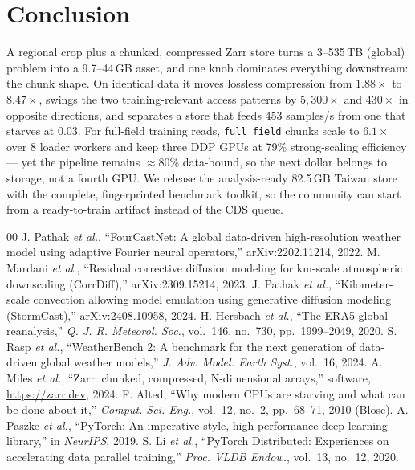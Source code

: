 \documentclass[conference]{IEEEtran}
\begin{document}
\section{Conclusion}
A regional crop plus a chunked, compressed Zarr store turns a 3--535\,TB
(global) problem into a 9.7--44\,GB asset, and one knob dominates everything
downstream: the chunk shape. On identical data it moves lossless compression
from $1.88\times$ to $8.47\times$, swings the two training-relevant access
patterns by $5{,}300\times$ and $430\times$ in opposite directions, and
separates a store that feeds 453 samples/s from one that starves at 0.03.
For full-field training reads, \texttt{full\_field} chunks scale to $6.1\times$
over 8 loader workers and keep three DDP GPUs at 79\% strong-scaling
efficiency --- yet the pipeline remains $\approx$80\% data-bound, so the next
dollar belongs to storage, not a fourth GPU. We release the analysis-ready
82.5\,GB Taiwan store with the complete, fingerprinted benchmark toolkit, so
the community can start from a ready-to-train artifact instead of the CDS
queue.

\begin{thebibliography}{00}
 J. Pathak \emph{et al.}, ``FourCastNet: A global data-driven
high-resolution weather model using adaptive Fourier neural operators,''
arXiv:2202.11214, 2022.
 M. Mardani \emph{et al.}, ``Residual corrective diffusion
modeling for km-scale atmospheric downscaling (CorrDiff),'' arXiv:2309.15214,
2023.
 J. Pathak \emph{et al.}, ``Kilometer-scale convection
allowing model emulation using generative diffusion modeling (StormCast),''
arXiv:2408.10958, 2024.
 H. Hersbach \emph{et al.}, ``The ERA5 global reanalysis,''
\emph{Q. J. R. Meteorol. Soc.}, vol.~146, no.~730, pp.~1999--2049, 2020.
 S. Rasp \emph{et al.}, ``WeatherBench 2: A benchmark for the
next generation of data-driven global weather models,'' \emph{J. Adv. Model.
Earth Syst.}, vol.~16, 2024.
 A. Miles \emph{et al.}, ``Zarr: chunked, compressed,
N-dimensional arrays,'' software, \url{https://zarr.dev}, 2024.
 F. Alted, ``Why modern CPUs are starving and what can be done
about it,'' \emph{Comput. Sci. Eng.}, vol.~12, no.~2, pp.~68--71, 2010
(Blosc).
 A. Paszke \emph{et al.}, ``PyTorch: An imperative style,
high-performance deep learning library,'' in \emph{NeurIPS}, 2019.
 S. Li \emph{et al.}, ``PyTorch Distributed: Experiences on
accelerating data parallel training,'' \emph{Proc. VLDB Endow.}, vol.~13,
no.~12, 2020.
\end{thebibliography}
\end{document}
